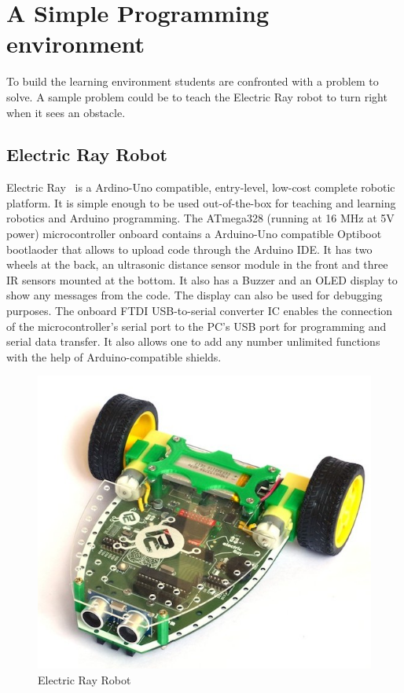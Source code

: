 \documentclass[conference]{IEEEtran}
\begin{document}
\section{A Simple Programming environment}

To build the learning environment students are confronted with a problem to solve. A sample problem could be to teach the Electric Ray robot to turn right when it sees an obstacle.

\subsection{Electric Ray Robot}

Electric Ray~\cite{eray} is a Ardino-Uno compatible, entry-level, low-cost complete robotic platform. It is simple enough to be used out-of-the-box for teaching and learning  robotics and Arduino programming.  The ATmega328 (running at 16 MHz at 5V power) microcontroller onboard contains a Arduino-Uno compatible Optiboot bootlaoder that allows to upload code through the Arduino IDE. It has two wheels at the back, an ultrasonic distance sensor module in the front and three IR sensors mounted at the bottom. It also has a Buzzer and an OLED display to show any messages from the code. The display can also be used for debugging purposes. The onboard FTDI USB-to-serial converter IC enables the connection of the microcontroller's serial port to the PC's USB port for programming and serial data transfer.  It also allows one to add any number unlimited functions with the help of Arduino-compatible shields.

\begin{figure}[h]
\centering
\includegraphics[scale=0.2]{Fig_05.png}
\caption{Electric Ray Robot}
\end{figure}
\end{document}
